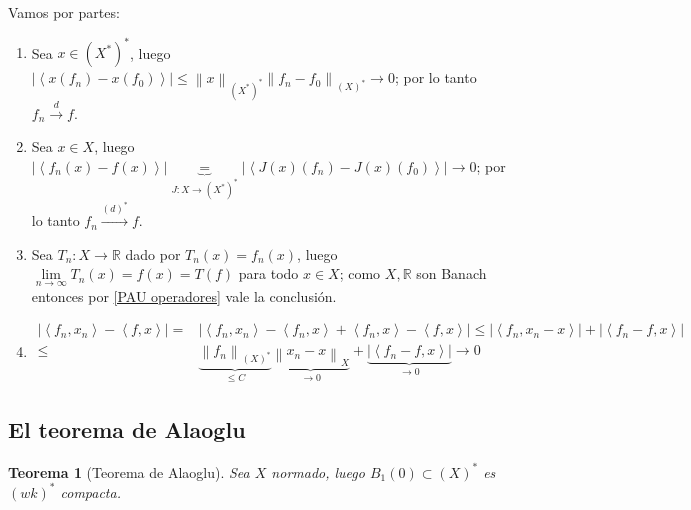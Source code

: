 \documentclass[11pt]{article}
\newcommand{\R}{{\mathbb{R}}}
\newcommand{\dual}[1]{\left(#1\right)^{\ast}}
\newcommand{\ddual}[1]{\left(#1^{\ast}\right)^{\ast}}
\newcommand{\norm}[1]{\left\lVert#1\right\rVert}
\newcommand{\abs}[1]{\left\lvert#1\right\rvert}
\newcommand{\ip}[1]{\left\langle#1\right\rangle}
\newtheorem{theorem}{Teorema}
\numberwithin{theorem}{subsection}
\newenvironment{proof}[1][Demostraci\'on]{\begin{trivlist}
		\item[\hskip \labelsep {\bfseries #1}]}{\end{trivlist}}
\newcommand{\qed}{\nobreak \ifvmode \relax \else
	\ifdim\lastskip<1.5em \hskip-\lastskip
	\hskip1.5em plus0em minus0.5em \fi \nobreak
	\vrule height0.75em width0.5em depth0.25em\fi}
\begin{document}
\begin{proof}
	Vamos por partes:
	
	\begin{enumerate}
		\item Sea $x \in \ddual{X}$, luego $\abs{\ip{x(f_n) - x(f_0)}} \leq \norm{x}_{\ddual{X}} \norm{f_n-f_0}_{\dual{X}} \rightarrow 0$; por lo tanto $f_n \xrightarrow{d} f$.
		\item Sea $x \in X$, luego $\abs{\ip{f_n(x) - f(x)}} \underbrace{=}_{J:X \rightarrow \ddual{X}} \abs{\ip{J(x)(f_n) - J(x)(f_0)}} \rightarrow 0$; por lo tanto $f_n \xrightarrow{\dual{d}} f$.
		\item Sea $T_n : X \rightarrow \R$ dado por $T_n(x) = f_n(x)$, luego $\lim\limits_{n \rightarrow \infty}{T_n(x)} = f(x) = T(f)$ para todo $x \in X$; como $X, \R$ son Banach entonces por \ref{PAU operadores} vale la conclusi\'on.
		\item 
		\begin{equation*}
		\begin{aligned}
		\abs{\ip{f_n,x_n} - \ip{f,x}} = & \abs{\ip{f_n,x_n} - \ip{f_n,x} + \ip{f_n,x} - \ip{f,x}} \leq \abs{\ip{f_n ,x_n-x}} + \abs{\ip{f_n - f,x}} \\
		\leq & \underbrace{\norm{f_n}_{\dual{X}}}_{\leq C} \underbrace{\norm{x_n-x}_{X}}_{\rightarrow 0} + \underbrace{\abs{\ip{f_n -f,x}}}_{\rightarrow 0} \rightarrow 0
		\end{aligned}
		\end{equation*}\qed
	\end{enumerate}
	
\end{proof}

\subsection{El teorema de Alaoglu}

\begin{theorem}[Teorema de Alaoglu]
	\label{Teorema de Alaoglu}
	Sea $X$ normado, luego $B_1(0) \subset \dual{X}$ es $\dual{wk}$ compacta.
\end{theorem}
\end{document}
